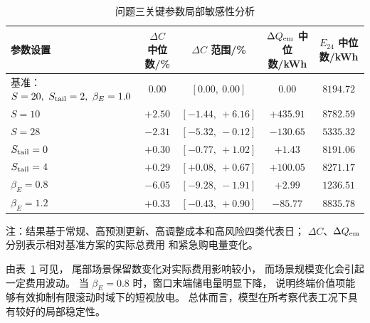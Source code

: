 \documentclass[zihao=-4,a4paper,UTF8,fontset=none]{ctexart}
\begin{document}
\begin{table}[H]
    \centering
    \caption{问题三关键参数局部敏感性分析}
    \label{tab:q3_sensitivity}
    \scriptsize
    \setlength{\tabcolsep}{4.2pt}
    \renewcommand{\arraystretch}{1.10}

    \begin{tabular}{lcccc}
        \toprule
        参数设置
        & $\Delta C$ 中位数/\%
        & $\Delta C$ 范围/\%
        & $\Delta Q_{\rm em}$ 中位数/kWh
        & $E_{24}$ 中位数/kWh \\
        \midrule

        基准：$S=20,\ S_{\rm tail}=2,\ \beta_E=1.0$
        & $0.00$
        & $[0.00,\ 0.00]$
        & $0.00$
        & $8194.72$ \\

        $S=10$
        & $+2.50$
        & $[-1.44,\ +6.16]$
        & $+435.91$
        & $8782.59$ \\

        $S=28$
        & $-2.31$
        & $[-5.32,\ -0.12]$
        & $-130.65$
        & $5335.32$ \\

        $S_{\rm tail}=0$
        & $+0.30$
        & $[-0.77,\ +1.02]$
        & $+1.43$
        & $8191.06$ \\

        $S_{\rm tail}=4$
        & $+0.29$
        & $[+0.08,\ +0.67]$
        & $+100.05$
        & $8271.17$ \\

        $\beta_E=0.8$
        & $-6.05$
        & $[-9.28,\ -1.91]$
        & $+2.99$
        & $1236.51$ \\

        $\beta_E=1.2$
        & $+0.33$
        & $[-0.43,\ +0.90]$
        & $-85.77$
        & $8835.78$ \\

        \bottomrule
    \end{tabular}

    \vspace{1mm}
    \footnotesize
    \parbox{0.96\textwidth}{
    注：结果基于常规、高预测更新、高调整成本和高风险四类代表日；
    $\Delta C$、$\Delta Q_{\rm em}$ 分别表示相对基准方案的实际总费用
    和紧急购电量变化。
    }
\end{table}

由表~\ref{tab:q3_sensitivity} 可见，
尾部场景保留数变化对实际费用影响较小，
而场景规模变化会引起一定费用波动。
当 $\beta_E=0.8$ 时，窗口末端储电量明显下降，
说明终端价值项能够有效抑制有限滚动时域下的短视放电。
总体而言，模型在所考察代表工况下具有较好的局部稳定性。
\end{document}
